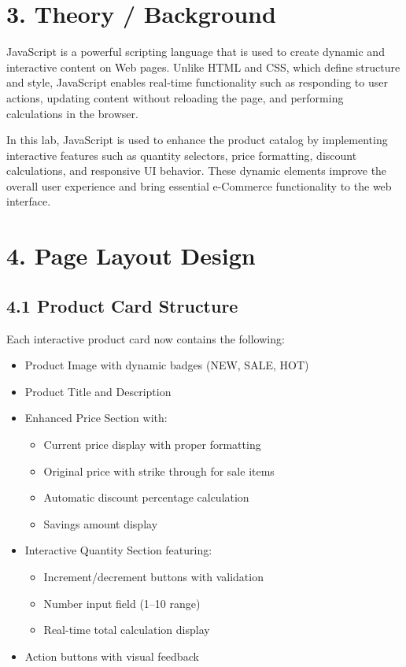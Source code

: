 \documentclass[a4paper,12pt]{article}
\begin{document}
\section*{3. Theory / Background}
JavaScript is a powerful scripting language that is used to create dynamic and interactive content on Web pages. Unlike HTML and CSS, which define structure and style, JavaScript enables real-time functionality such as responding to user actions, updating content without reloading the page, and performing calculations in the browser.

In this lab, JavaScript is used to enhance the product catalog by implementing interactive features such as quantity selectors, price formatting, discount calculations, and responsive UI behavior. These dynamic elements improve the overall user experience and bring essential e-Commerce functionality to the web interface.

\section*{4. Page Layout Design}
\subsection*{4.1 Product Card Structure}
Each interactive product card now contains the following: 
\begin{itemize}
  \item Product Image with dynamic badges (NEW, SALE, HOT)
  \item Product Title and Description
  \item Enhanced Price Section with:
    \begin{itemize}
      \item Current price display with proper formatting
      \item Original price with strike through for sale items
      \item Automatic discount percentage calculation
      \item Savings amount display
    \end{itemize}
  \item Interactive Quantity Section featuring:
    \begin{itemize}
      \item Increment/decrement buttons with validation
      \item Number input field (1--10 range)
      \item Real-time total calculation display
    \end{itemize}
  \item Action buttons with visual feedback
\end{itemize}
\end{document}
